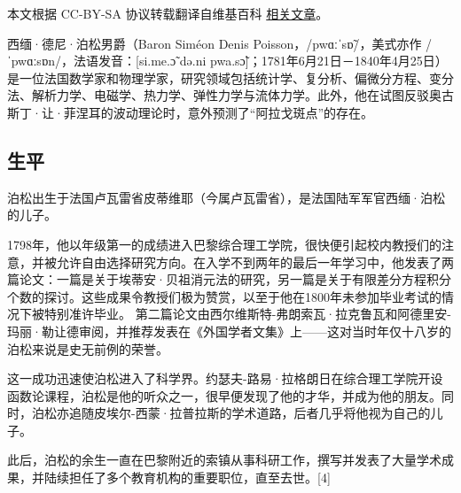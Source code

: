 
本文根据 CC-BY-SA 协议转载翻译自维基百科 \href{https://en.wikipedia.org/wiki/Sim\%C3\%A9on_Denis_Poisson}{相关文章}。

西缅·德尼·泊松男爵（Baron Siméon Denis Poisson，/pwɑːˈsɒ̃/，美式亦作 /ˈpwɑːsɒn/，法语发音：[si.me.ɔ̃ də.ni pwa.sɔ̃]；1781年6月21日－1840年4月25日）是一位法国数学家和物理学家，研究领域包括统计学、复分析、偏微分方程、变分法、解析力学、电磁学、热力学、弹性力学与流体力学。此外，他在试图反驳奥古斯丁·让·菲涅耳的波动理论时，意外预测了“阿拉戈斑点”的存在。
\subsection{生平}
泊松出生于法国卢瓦雷省皮蒂维耶（今属卢瓦雷省），是法国陆军军官西缅·泊松的儿子。

1798年，他以年级第一的成绩进入巴黎综合理工学院，很快便引起校内教授们的注意，并被允许自由选择研究方向。在入学不到两年的最后一年学习中，他发表了两篇论文：一篇是关于埃蒂安·贝祖消元法的研究，另一篇是关于有限差分方程积分个数的探讨。这些成果令教授们极为赞赏，以至于他在1800年未参加毕业考试的情况下被特别准许毕业。 第二篇论文由西尔维斯特-弗朗索瓦·拉克鲁瓦和阿德里安-玛丽·勒让德审阅，并推荐发表在《外国学者文集》上——这对当时年仅十八岁的泊松来说是史无前例的荣誉。

这一成功迅速使泊松进入了科学界。约瑟夫-路易·拉格朗日在综合理工学院开设函数论课程，泊松是他的听众之一，很早便发现了他的才华，并成为他的朋友。同时，泊松亦追随皮埃尔-西蒙·拉普拉斯的学术道路，后者几乎将他视为自己的儿子。

此后，泊松的余生一直在巴黎附近的索镇从事科研工作，撰写并发表了大量学术成果，并陆续担任了多个教育机构的重要职位，直至去世。[4]

